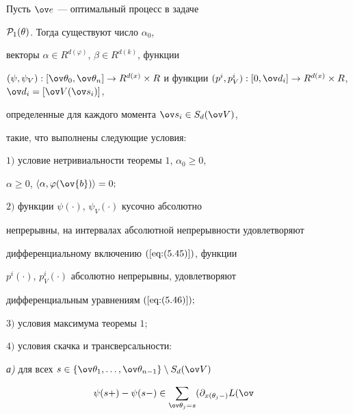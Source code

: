 \begin{thm}


Пусть $\ov e$ --- оптимальный процесс в задаче


${\cal P}_1(\theta)$. Тогда существуют число $\alpha_0$,


векторы $\alpha\in R^{d(\varphi)}$, $\beta\in R^{d(k)}$, функции


$(\psi,\psi_V):[\ov\theta_0,\ov\theta_n]\rightarrow


R^{d(x)}\times R$ и функции $(p^i,p_V^i):[0,\ov d_i]\rightarrow


R^{d(x)}\times R$, $\ov d_i=[\ov V(\ov s_i)]$,


определенные для каждого момента $\ov s_i\in S_d(\ov V)$,


такие, что выполнены следующие условия$:$





$1)$ условие нетривиальности теоремы $1$, $\alpha_0\geq 0$,


$\alpha\geq 0$, $\langle \alpha,\varphi(\ov{b})\rangle =0;$





$2)$ функции $\psi(\cdot)$, $\psi_V(\cdot)$ кусочно абсолютно


непрерывны, на интервалах абсолютной непрерывности удовлетворяют


дифференциальному включению $(\ref{eq:(5.45)})$, функции


$p^i(\cdot)$, $p_V^i(\cdot)$ абсолютно непрерывны, удовлетворяют


дифференциальным уравнениям $(\ref{eq:(5.46)});$





$3)$ условия максимума теоремы $1;$





$4)$ условия скачка и трансверсальности:





{\em а)} для всех $s\in


\{\ov\theta_1,\dotsc,\ov\theta_{n-1}\}\setminus S_d(\ov V)$


\begin{align*}


\psi(s+)-\psi(s-)&\in


\sum_{\ov\theta_j=s}(


\partial_{x(\theta_j-)}L(\ov



\end{align*}
\end{thm}
